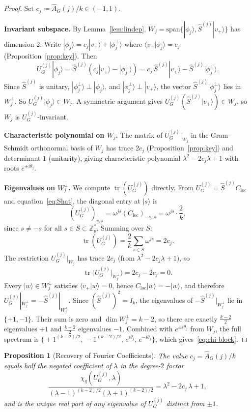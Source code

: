 \documentclass[12pt]{article}
\newtheorem{proposition}[theorem]{Proposition}
\newcommand{\Z}{\mathbb{Z}}
\newcommand{\eqdef}{\coloneqq}
\newcommand{\ket}[1]{|#1\rangle}
\newcommand{\braket}[2]{\langle #1 | #2 \rangle}
\newcommand{\Uj}{U_G^{(j)}}
\newcommand{\Shat}{\hat{S}^{(j)}}
\newcommand{\Ahat}{\widehat{A}_G}
\newcommand{\vplus}{v_+}
\newcommand{\phij}{\phi_j}
\begin{document}
\begin{proof}
  Set $c_j \eqdef \Ahat(j)/k \in (-1,1)$.

  \medskip
  \noindent\textbf{Invariant subspace.}
  By Lemma~\ref{lem:lindep}, $W_j = \mathrm{span}\{\ket{\phij},
  \Shat\ket{\vplus}\}$ has dimension $2$.  Write
  $\ket{\phij} = c_j\ket{\vplus}+\ket{\phij^\perp}$ where
  $\braket{\vplus}{\phij}=c_j$ (Proposition~\ref{prop:key}).  Then
  \[
    \Uj\ket{\phij}
    = \Shat(c_j\ket{\vplus}-\ket{\phij^\perp})
    = c_j\,\Shat\ket{\vplus} - \Shat\ket{\phij^\perp}.
  \]
  Since $\Shat$ is unitary, $\ket{\phij^\perp}\perp\ket{\phij}$, and
  $\ket{\phij^\perp}\perp\ket{\vplus}$, the vector $\Shat\ket{\phij^\perp}$
  lies in $W_j^\perp$.  So $\Uj\ket{\phij}\in W_j$.  A symmetric argument
  gives $\Uj(\Shat\ket{\vplus})\in W_j$, so $W_j$ is $\Uj$-invariant.

  \medskip
  \noindent\textbf{Characteristic polynomial on $W_j$.}
  The matrix of $\Uj|_{W_j}$ in the Gram--Schmidt orthonormal basis of
  $W_j$ has trace $2c_j$ (Proposition~\ref{prop:key}) and determinant $1$
  (unitarity), giving characteristic polynomial
  $\lambda^2-2c_j\lambda+1$ with roots $e^{\pm i\theta_j}$.

  \medskip
  \noindent\textbf{Eigenvalues on $W_j^\perp$.}
  We compute $\operatorname{tr}(\Uj)$ directly.  From
  $\Uj = \Shat C_{\mathrm{loc}}$ and equation~\eqref{eq:Shat}, the
  diagonal entry at $\ket{s}$ is
  \[
    (\Uj)_{s,s} = \omega^{js}(C_{\mathrm{loc}})_{-s,\,s}
                = \omega^{js}\cdot\frac{2}{k},
  \]
  since $s \neq -s$ for all $s \in S \subset \Z_p^*$.
  Summing over $S$:
  \[
    \operatorname{tr}(\Uj) = \frac{2}{k}\sum_{s\in S}\omega^{js} = 2c_j.
  \]
  The restriction $\Uj|_{W_j}$ has trace $2c_j$ (from
  $\lambda^2-2c_j\lambda+1$), so
  \[
    \operatorname{tr}\!\bigl(\Uj|_{W_j^\perp}\bigr) = 2c_j - 2c_j = 0.
  \]
  Every $\ket{w}\in W_j^\perp$ satisfies $\braket{\vplus}{w}=0$, hence
  $C_{\mathrm{loc}}\ket{w}=-\ket{w}$, and therefore
  $\Uj|_{W_j^\perp} = -\Shat|_{W_j^\perp}$.
  Since $(\Shat)^2 = I_k$, the eigenvalues of $-\Shat|_{W_j^\perp}$ lie
  in $\{+1,-1\}$.  Their sum is zero and
  $\dim W_j^\perp = k-2$, so there are exactly $\tfrac{k-2}{2}$
  eigenvalues $+1$ and $\tfrac{k-2}{2}$ eigenvalues $-1$.
  Combined with $e^{\pm i\theta_j}$ from $W_j$, the full spectrum is
  $\bigl\{+1^{(k-2)/2},\,-1^{(k-2)/2},\,e^{i\theta_j},\,e^{-i\theta_j}
  \bigr\}$, which gives~\eqref{eq:chi-block}.
\end{proof}

\begin{proposition}[Recovery of Fourier Coefficients]\label{prop:recovery}
  The value $c_j = \Ahat(j)/k$ equals half the negated coefficient of
  $\lambda$ in the degree-$2$ factor
  \[
    \frac{\chi_q(\Uj, \lambda)}{(\lambda-1)^{(k-2)/2}(\lambda+1)^{(k-2)/2}}
    = \lambda^2 - 2c_j\,\lambda + 1,
  \]
  and is the unique real part of any eigenvalue of $\Uj$ distinct from
  $\pm 1$.
\end{proposition}
\end{document}
